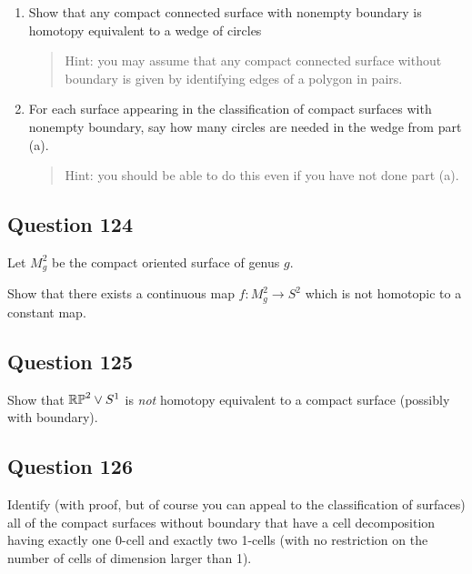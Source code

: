 \documentclass[12pt]{article}
\begin{document}
\begin{enumerate}
\def\labelenumi{\alph{enumi}.}
\item
  Show that any compact connected surface with nonempty boundary is
  homotopy equivalent to a wedge of circles

  \begin{quote}
  Hint: you may assume that any compact connected surface without
  boundary is given by identifying edges of a polygon in pairs.
  \end{quote}
\item
  For each surface appearing in the classification of compact surfaces
  with nonempty boundary, say how many circles are needed in the wedge
  from part (a).

  \begin{quote}
  Hint: you should be able to do this even if you have not done part
  (a).
  \end{quote}
\end{enumerate}

\hypertarget{question-124-2}{%
\subsection{Question 124}\label{question-124-2}}

Let \(M_g^2\) be the compact oriented surface of genus \(g\).

Show that there exists a continuous map \(f : M_g^2 \to S^2\) which is
not homotopic to a constant map.

\hypertarget{question-125-2}{%
\subsection{Question 125}\label{question-125-2}}

Show that \({\mathbb{RP}}^2 \lor S^1\) is \emph{not} homotopy equivalent to a
compact surface (possibly with boundary).

\hypertarget{question-126-1}{%
\subsection{Question 126}\label{question-126-1}}

Identify (with proof, but of course you can appeal to the classification
of surfaces) all of the compact surfaces without boundary that have a
cell decomposition having exactly one 0-cell and exactly two 1-cells
(with no restriction on the number of cells of dimension larger than 1).
\end{document}
